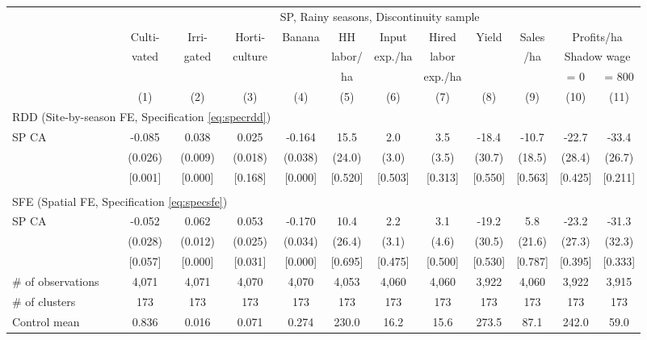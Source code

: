 \begin{tabular}{lccccccccccc}
\hline \hline
 & \multicolumn{11}{c}{SP, Rainy seasons, Discontinuity sample} \\
\cmidrule(lr){2-12}
 & Culti- & Irri- & Horti- & Banana & HH & Input & Hired & Yield & Sales & \multicolumn{2}{c}{Profits/ha} \\
 & vated & gated & culture & & labor/ & exp./ha & labor & & /ha & \multicolumn{2}{c}{Shadow wage} \\
 & & & & & ha & & exp./ha & & & = 0 & = 800 \\
\cmidrule(lr){2-2}\cmidrule(lr){3-3}\cmidrule(lr){4-4}\cmidrule(lr){5-5}\cmidrule(lr){6-6}\cmidrule(lr){7-7}\cmidrule(lr){8-8}\cmidrule(lr){9-9}\cmidrule(lr){10-10}\cmidrule(lr){11-11}\cmidrule(lr){12-12}
 & (1) & (2) & (3) & (4) & (5) & (6) & (7) & (8) & (9) & (10) & (11) \\
\hline
\multicolumn{4}{l}{RDD (Site-by-season FE, Specification \ref{eq:specrdd})} & & & & & & & & \\
\cmidrule(lr){1-4}
SP CA & -0.085\hphantom{-} & 0.038 & 0.025 & -0.164\hphantom{-} & 15.5 & 2.0 & 3.5 & -18.4\hphantom{-} & -10.7\hphantom{-} & -22.7\hphantom{-} & -33.4\hphantom{-} \\
 & (0.026) & (0.009) & (0.018) & (0.038) & (24.0) & (3.0) & (3.5) & (30.7) & (18.5) & (28.4) & (26.7) \\
 & [0.001] & [0.000] & [0.168] & [0.000] & [0.520] & [0.503] & [0.313] & [0.550] & [0.563] & [0.425] & [0.211] \\
\\[-0.5em]
\multicolumn{4}{l}{SFE (Spatial FE, Specification \ref{eq:specsfe})} & & & & & & & & \\
\cmidrule(lr){1-4}
SP CA & -0.052\hphantom{-} & 0.062 & 0.053 & -0.170\hphantom{-} & 10.4 & 2.2 & 3.1 & -19.2\hphantom{-} & 5.8 & -23.2\hphantom{-} & -31.3\hphantom{-} \\
 & (0.028) & (0.012) & (0.025) & (0.034) & (26.4) & (3.1) & (4.6) & (30.5) & (21.6) & (27.3) & (32.3) \\
 & [0.057] & [0.000] & [0.031] & [0.000] & [0.695] & [0.475] & [0.500] & [0.530] & [0.787] & [0.395] & [0.333] \\
\hline
\# of observations & 4,071 & 4,071 & 4,070 & 4,070 & 4,053 & 4,060 & 4,060 & 3,922 & 4,060 & 3,922 & 3,915 \\
\# of clusters & 173 & 173 & 173 & 173 & 173 & 173 & 173 & 173 & 173 & 173 & 173 \\
Control mean & 0.836 & 0.016 & 0.071 & 0.274 & 230.0 & 16.2 & 15.6 & 273.5 & 87.1 & 242.0 & 59.0 \\
\hline
\end{tabular}
